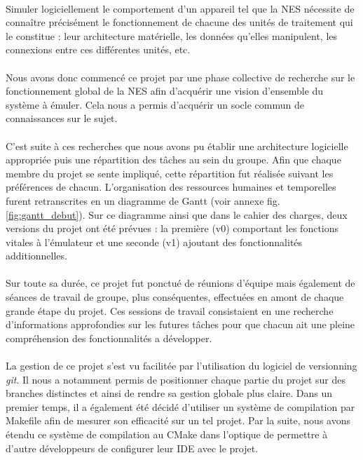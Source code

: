 \paragraph{}

Simuler logiciellement le comportement d'un appareil tel que la NES nécessite de connaître précisément le fonctionnement de chacune des unités de traitement qui le constitue : leur architecture matérielle, les données qu'elles manipulent, les connexions entre ces différentes unités, etc.

\paragraph{}
Nous avons donc commencé ce projet par une phase collective de recherche sur le fonctionnement global de la NES afin d'acquérir une vision d'ensemble du système à émuler. Cela nous a permis d'acquérir un socle commun de connaissances sur le sujet.

\paragraph{}
C'est suite à ces recherches que nous avons pu établir une architecture logicielle appropriée puis une répartition des tâches au sein du groupe. Afin que chaque membre du projet se sente impliqué, cette répartition fut réalisée suivant les préférences de chacun. L'organisation des ressources humaines et temporelles furent retranscrites en un diagramme de Gantt (voir annexe fig. \ref{fig:gantt_debut}). Sur ce diagramme ainsi que dans le cahier des charges, deux versions du projet ont été prévues : la première (v0) comportant les fonctions vitales à l'émulateur et une seconde (v1) ajoutant des fonctionnalités additionnelles.

\paragraph{}
Sur toute sa durée, ce projet fut ponctué de réunions d'équipe mais également de séances de travail de groupe, plus conséquentes, effectuées en amont de chaque grande étape du projet. Ces sessions de travail consistaient en une recherche d'informations approfondies sur les futures tâches pour que chacun ait une pleine compréhension des fonctionnalités a développer.

\paragraph{}
La gestion de ce projet s'est vu facilitée par l'utilisation du logiciel de versionning \emph{git}. Il nous a notamment permis de positionner chaque partie du projet sur des branches distinctes et ainsi de rendre sa gestion globale plus claire. Dans un premier temps, il a également été décidé d'utiliser un système de compilation par Makefile afin de mesurer son efficacité sur un tel projet. Par la suite, nous avons étendu ce système de compilation au CMake dans l'optique de permettre à d'autre développeurs de configurer leur IDE avec le projet.
